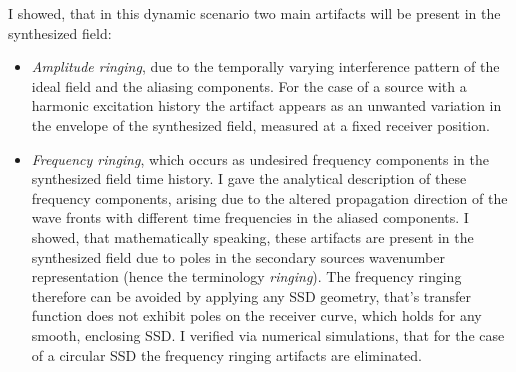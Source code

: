 \documentclass[a4paper,10pt]{article}
\begin{document}
\begin{itemize}
\begin{itemize}
I showed, that in this dynamic scenario two main artifacts will be present in the synthesized field:
	\begin{itemize}
	\item \emph{Amplitude ringing}, due to the temporally varying interference pattern of the ideal field and the aliasing components. For the case of a source with a harmonic excitation history the artifact appears as an unwanted variation in the envelope of the synthesized field, measured at a fixed receiver position.
	\item \emph{Frequency ringing}, which occurs as undesired frequency components in the synthesized field time history. I gave the analytical description of these frequency components, arising due to the altered propagation direction of the wave fronts with different time frequencies in the aliased components. I showed, that mathematically speaking, these artifacts are present in the synthesized field due to poles in the secondary sources wavenumber representation (hence the terminology \emph{ringing}). The frequency ringing therefore can be avoided by applying any SSD geometry, that's transfer function does not exhibit poles on the receiver curve, which holds for any smooth, enclosing SSD. I verified via numerical simulations, that for the case of a circular SSD the frequency ringing artifacts are eliminated. 
	\end{itemize}
	\end{itemize}
\end{itemize}
\end{document}
